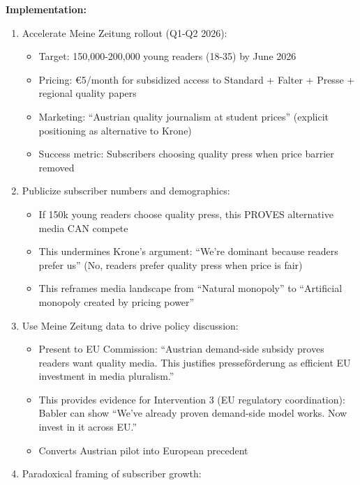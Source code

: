 \textbf{Implementation:}

\begin{enumerate}
\item Accelerate Meine Zeitung rollout (Q1-Q2 2026):

  \begin{itemize}
  \item Target: 150,000-200,000 young readers (18-35) by June 2026
  \item Pricing: €5/month for subsidized access to Standard + Falter + Presse + regional quality papers
  \item Marketing: ``Austrian quality journalism at student prices'' (explicit positioning as alternative to Krone)
  \item Success metric: Subscribers choosing quality press when price barrier removed
  \end{itemize}

\item Publicize subscriber numbers and demographics:

  \begin{itemize}
  \item If 150k young readers choose quality press, this PROVES alternative media CAN compete
  \item This undermines Krone's argument: ``We're dominant because readers prefer us''
    (No, readers prefer quality press when price is fair)
  \item This reframes media landscape from ``Natural monopoly'' to ``Artificial monopoly created by pricing power''
  \end{itemize}

\item Use Meine Zeitung data to drive policy discussion:

  \begin{itemize}
  \item Present to EU Commission: ``Austrian demand-side subsidy proves readers want quality media.
    This justifies presseförderung as efficient EU investment in media pluralism.''
  \item This provides evidence for Intervention 3 (EU regulatory coordination): Babler can show
    ``We've already proven demand-side model works. Now invest in it across EU.''
  \item Converts Austrian pilot into European precedent
  \end{itemize}

\item Paradoxical framing of subscriber growth:


\end{enumerate}
